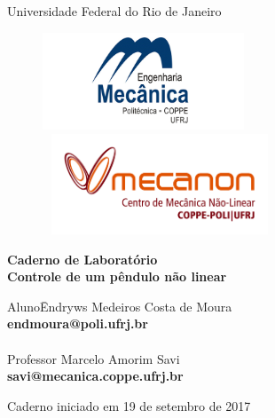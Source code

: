 \documentclass[idxtotoc,hyperref,openany]{labbook} %
\begin{document}

\begin{titlepage}
	\begin{center}
		\huge{Universidade Federal do Rio de Janeiro}

\vspace{10pt}
\begin{figure}[!ht]
\centering
\includegraphics[width=6cm]{mec.jpg}
\hspace{1cm}
\includegraphics[height=3cm, width=7cm]{Mecanon.jpg}
\end{figure}
        
        \vspace{85pt}
        
		\textbf{\LARGE{Caderno de Laboratório}}
		\large{\\ \textbf{Controle de um pêndulo não linear}}
		\vspace{160pt}
		
	\end{center}
	
	\begin{flushleft}
		\begin{tabbing}
			Aluno\qquad\qquad\= Endryws Medeiros Costa de Moura\\
			\>\hspace{7mm}\textbf{endmoura@poli.ufrj.br}\\
			\\
			
			Professor\> Marcelo Amorim Savi \\
			\>\hspace{-5mm}\textbf{savi@mecanica.coppe.ufrj.br}
		
	\end{tabbing}
		  
	\end{flushleft}
	
	\begin{center}
		\vspace{\fill}
		Caderno iniciado em 19 de setembro de 2017
	\end{center}
\end{titlepage}
\end{document}
